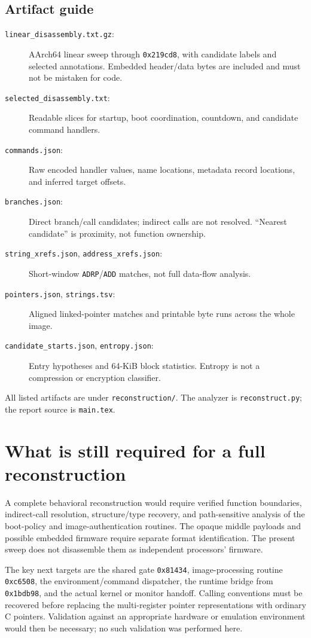 \documentclass[11pt]{article}
\newcommand{\off}[1]{\texttt{0x#1}}
\begin{document}
\subsection{Artifact guide}
\begin{description}
\item[\texttt{linear\_disassembly.txt.gz}:] AArch64 linear sweep through
\off{219cd8}, with candidate labels and selected annotations. Embedded
header/data bytes are included and must not be mistaken for code.
\item[\texttt{selected\_disassembly.txt}:] Readable slices for startup,
boot coordination, countdown, and candidate command handlers.
\item[\texttt{commands.json}:] Raw encoded handler values, name locations,
metadata record locations, and inferred target offsets.
\item[\texttt{branches.json}:] Direct branch/call candidates; indirect
calls are not resolved. ``Nearest candidate'' is proximity, not function ownership.
\item[\texttt{string\_xrefs.json}, \texttt{address\_xrefs.json}:]
Short-window \texttt{ADRP}/\texttt{ADD} matches, not full data-flow analysis.
\item[\texttt{pointers.json}, \texttt{strings.tsv}:] Aligned linked-pointer
matches and printable byte runs across the whole image.
\item[\texttt{candidate\_starts.json}, \texttt{entropy.json}:]
Entry hypotheses and 64-KiB block statistics. Entropy is not a compression
or encryption classifier.
\end{description}
All listed artifacts are under \texttt{reconstruction/}. The analyzer is
\texttt{reconstruct.py}; the report source is \texttt{main.tex}.

\section{What is still required for a full reconstruction}
A complete behavioral reconstruction would require verified function
boundaries, indirect-call resolution, structure/type recovery, and
path-sensitive analysis of the boot-policy and image-authentication routines.
The opaque middle payloads and possible embedded firmware require separate
format identification. The present sweep does not disassemble them as
independent processors' firmware.

The key next targets are the shared gate \off{81434}, image-processing
routine \off{c6508}, the environment/command dispatcher, the runtime bridge
from \off{1bdb98}, and the actual kernel or monitor handoff. Calling
conventions must be recovered before replacing the multi-register pointer
representations with ordinary C pointers. Validation against an appropriate
hardware or emulation environment would then be necessary; no such validation
was performed here.
\end{document}
